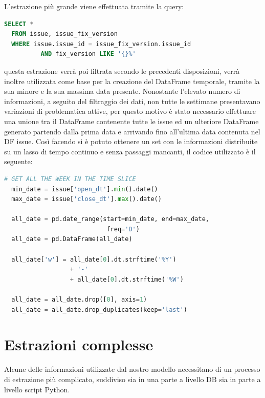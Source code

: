 \documentclass[%
    corpo=12pt,
    twoside,
    oldstyle,
    autoretitolo,
    greek,
    evenboxes,
]{toptesi}
\begin{document}
L'estrazione più grande viene effettuata tramite la query:
\begin{lstlisting}[language=SQL, frame=single, basicstyle=\small]
  SELECT * 
  FROM issue, issue_fix_version
  WHERE issue.issue_id = issue_fix_version.issue_id 
          AND fix_version LIKE '{}%' 
\end{lstlisting}
questa estrazione verrà poi filtrata secondo le precedenti disposizioni, verrà inoltre utilizzata come base per la creazione del DataFrame temporale, tramite la sua minore e la sua massima data presente. Nonostante l'elevato numero di informazioni, a seguito del filtraggio dei dati, non tutte le settimane presentavano variazioni di problematica attive, per questo motivo è stato necessario effettuare una unione tra il DataFrame contenente tutte le issue ed un ulteriore DataFrame generato partendo dalla prima data e arrivando fino all'ultima data contenuta nel DF issue. Così facendo si è potuto ottenere un set con le informazioni distribuite su un lasso di tempo continuo e senza passaggi mancanti, il codice utilizzato è il seguente:
\begin{lstlisting}[language=Python, frame=single, basicstyle=\small]
  # GET ALL THE WEEK IN THE TIME SLICE
  min_date = issue['open_dt'].min().date()
  max_date = issue['close_dt'].max().date()
  
  all_date = pd.date_range(start=min_date, end=max_date,
                            freq='D')
  all_date = pd.DataFrame(all_date)

  all_date['w'] = all_date[0].dt.strftime('%Y') 
                  + '-' 
                  + all_date[0].dt.strftime('%W')

  all_date = all_date.drop([0], axis=1)
  all_date = all_date.drop_duplicates(keep='last')
\end{lstlisting}

\section{Estrazioni complesse}
Alcune delle informazioni utilizzate dal nostro modello necessitano di un processo di estrazione più complicato, suddiviso sia in una parte a livello DB sia in parte a livello script Python.
\end{document}
